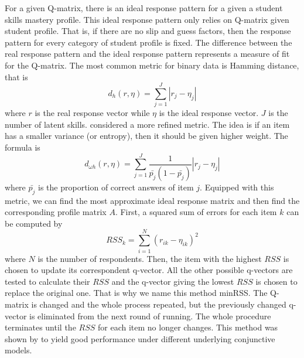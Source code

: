 \documentclass{edm_template}
\begin{document}
For a given Q-matrix, there is an ideal response pattern for a given a student skills mastery profile. This ideal response pattern only relies on Q-matrix given student profile. That is, if there are no slip and guess factors, then the response pattern for every category of student profile is fixed. The difference between the real response pattern and the ideal response pattern represents a measure of fit for the Q-matrix.  The most common metric for binary data is Hamming distance, that is
$$ d_h(r,\eta)=\sum_{j=1}^{J}|r_j-\eta_j|$$
where $r$ is the real response vector while $\eta$ is the ideal response vector. $J$ is the number of latent skills. \cite{chiu2013nonparametric} considered a more refined metric. The idea is if an item has a smaller variance (or entropy), then it should be given higher weight. The formula is
$$ d_{\omega h}(r,\eta)=\sum_{j=1}^{J}\frac{1}{\bar{p_j}(1-\bar{p_j})}|r_j-\eta_j|$$
where $\bar{p_j}$ is the proportion of correct answers of item $j$. Equipped with this metric, we can find the most approximate ideal response matrix and then find the corresponding profile matrix $A$. First, a squared sum of errors for each item $k$ can be computed by
$$ RSS_k=\sum_{i=1}^{N}(r_{ik}-\eta_{ik})^2$$
where $N$ is the number of respondents. Then, the item with the highest $RSS$ is chosen to update its correspondent q-vector. All the other possible q-vectors are tested to calculate their $RSS$ and the q-vector giving the lowest $RSS$ is chosen to replace the original one. That is why we name this method minRSS. The Q-matrix is changed and the whole process repeated, but the previously changed q-vector is eliminated from the next round of running. The whole procedure terminates until the $RSS$ for each item no longer changes.
This method  was shown by  to yield good performance under different underlying conjunctive models.
\end{document}
